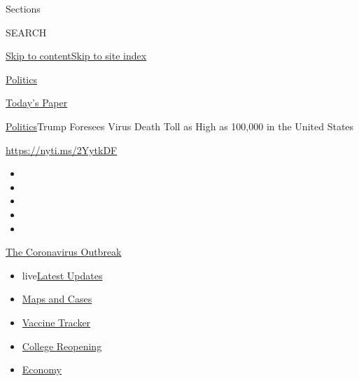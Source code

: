 Sections

SEARCH

\protect\hyperlink{site-content}{Skip to
content}\protect\hyperlink{site-index}{Skip to site index}

\href{https://www.nytimes.com/section/politics}{Politics}

\href{https://myaccount.nytimes.com/auth/login?response_type=cookie\&client_id=vi}{}

\href{https://www.nytimes.com/section/todayspaper}{Today's Paper}

\href{/section/politics}{Politics}\textbar{}Trump Foresees Virus Death
Toll as High as 100,000 in the United States

\url{https://nyti.ms/2YytkDF}

\begin{itemize}
\item
\item
\item
\item
\item
\end{itemize}

\href{https://www.nytimes.com/news-event/coronavirus?action=click\&pgtype=Article\&state=default\&region=TOP_BANNER\&context=storylines_menu}{The
Coronavirus Outbreak}

\begin{itemize}
\tightlist
\item
  live\href{https://www.nytimes.com/2020/08/04/world/coronavirus-cases.html?action=click\&pgtype=Article\&state=default\&region=TOP_BANNER\&context=storylines_menu}{Latest
  Updates}
\item
  \href{https://www.nytimes.com/interactive/2020/us/coronavirus-us-cases.html?action=click\&pgtype=Article\&state=default\&region=TOP_BANNER\&context=storylines_menu}{Maps
  and Cases}
\item
  \href{https://www.nytimes.com/interactive/2020/science/coronavirus-vaccine-tracker.html?action=click\&pgtype=Article\&state=default\&region=TOP_BANNER\&context=storylines_menu}{Vaccine
  Tracker}
\item
  \href{https://www.nytimes.com/2020/08/02/us/covid-college-reopening.html?action=click\&pgtype=Article\&state=default\&region=TOP_BANNER\&context=storylines_menu}{College
  Reopening}
\item
  \href{https://www.nytimes.com/live/2020/08/04/business/stock-market-today-coronavirus?action=click\&pgtype=Article\&state=default\&region=TOP_BANNER\&context=storylines_menu}{Economy}
\end{itemize}

